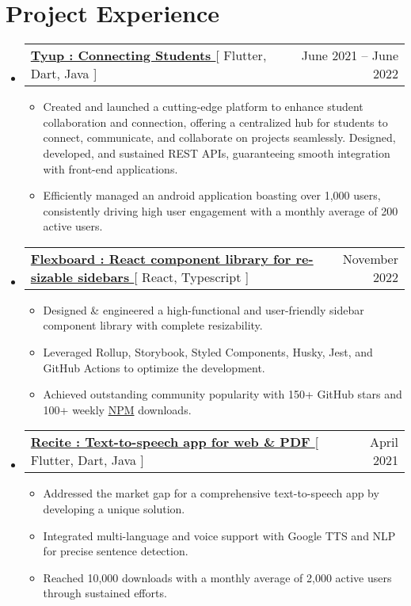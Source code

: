 \documentclass[letterpaper,11pt]{article}
\makeatletter
\newcommand{\resumeItem}[1]{
  \item\small{
    {#1 \vspace{-2pt}}
  }
}
\newcommand{\resumeProjectHeading}[2]{
    \item
    \begin{tabular*}{0.97\textwidth}{l@{\extracolsep{\fill}}r}
      \small#1 & #2 \\
    \end{tabular*}\vspace{-7pt}
}
\newcommand{\resumeSubHeadingListStart}{\begin{itemize}[leftmargin=0.15in, label={}]}
\newcommand{\resumeSubHeadingListEnd}{\end{itemize}}
\newcommand{\resumeItemListStart}{\begin{itemize}}
\newcommand{\resumeItemListEnd}{\end{itemize}\vspace{-5pt}}
\makeatother
\begin{document}


\section{Project Experience}
    
    \resumeSubHeadingListStart
      \resumeProjectHeading
          {\textbf{\href{https://play.google.com/store/apps/details?id=org.elitecaps.tyup}{Tyup : Connecting Students }}{[ Flutter, Dart, Java ]}}{June 2021 -- June 2022}
          \resumeItemListStart
           \resumeItem{Created and launched a cutting-edge platform to enhance student collaboration and connection, offering a centralized hub for students to connect, communicate, and collaborate on projects seamlessly. Designed, developed, and sustained REST APIs, guaranteeing smooth integration with front-end applications.}
           \resumeItem{Efficiently managed an android application boasting over 1,000 users, consistently driving high user engagement with a monthly average of 200 active users.}
          \resumeItemListEnd
    \resumeSubHeadingListEnd

    \resumeSubHeadingListStart
      \resumeProjectHeading
          {\textbf{\href{https://github.com/dorbus/flexboard}{Flexboard : React component library for re-sizable sidebars }}{[ React, Typescript ]}}{November 2022}
          \resumeItemListStart
            \resumeItem{Designed \& engineered a high-functional and user-friendly sidebar component library with complete resizability.}
                \resumeItem{Leveraged Rollup, Storybook, Styled Components, Husky, Jest, and GitHub Actions to optimize the development.}
            \resumeItem{Achieved outstanding community popularity with 150+ GitHub stars and 100+ weekly \href{https://www.npmjs.com/package/@dorbus/flexboard}{NPM} downloads.}
          \resumeItemListEnd
    \resumeSubHeadingListEnd
    
    \resumeSubHeadingListStart
      \resumeProjectHeading
          {\textbf{\href{https://play.google.com/store/apps/details?id=com.hackthedeveloper.recite}{Recite : Text-to-speech app for web \& PDF }}{[ Flutter, Dart, Java ]}}{April 2021}
          \resumeItemListStart
           \resumeItem{Addressed the market gap for a comprehensive text-to-speech app by developing a unique solution.}
           \resumeItem{Integrated multi-language and voice support with Google TTS and NLP for precise sentence detection.}
           \resumeItem{Reached 10,000 downloads with a monthly average of 2,000 active users through sustained efforts.}
          \resumeItemListEnd
    \resumeSubHeadingListEnd
\end{document}
